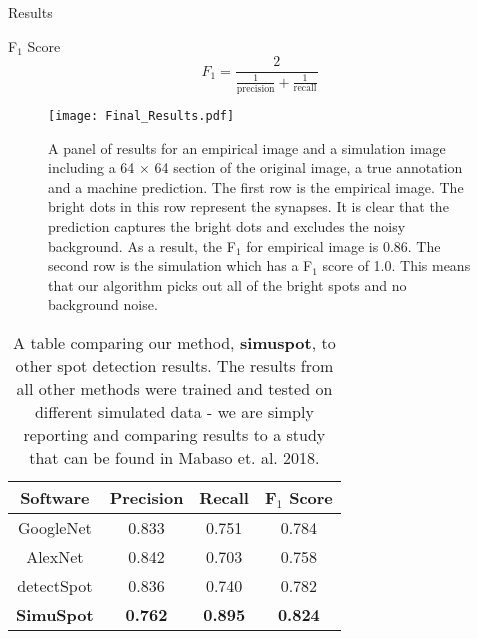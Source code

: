 \documentclass[final]{beamer}
\newlength{\onecolwid}
\begin{document}
\begin{frame}[t]
\begin{columns}[t]
\begin{column}{\onecolwid}
\begin{block}{Results}
\begin{alertblock}{F$_1$ Score}
      \begin{equation}
            F_1 =\frac{2}{\frac{1}{\text{precision}}+\frac{1}{\text{recall}}}
        \end{equation}
    \end{alertblock}
    
    \begin{figure}
        \texttt{[image: Final\_Results.pdf]}
         \setlength{\belowcaptionskip}{-30pt}
        \caption{ A panel of results for an empirical image and a simulation image including a 64 $\times$ 64 section of the original image, a true annotation and a machine prediction. The first row is the empirical image. The bright dots in this row represent the synapses. It is clear that the prediction captures the bright dots and excludes the noisy background. As a result, the F$_1$ for empirical image is 0.86. The second row is the simulation which has a F$_1$ score of 1.0. This means that our algorithm picks out all of the bright spots and no background noise.}
    \end{figure}
    \vspace{.5in}

    \begin{table}[h]
        \setlength{\tabcolsep}{40pt}
        \centering
        \begin{tabular}{|c|c|c|c|}
            \hline
            Software & Precision & Recall & F$_1$ Score \\
            \hline
            GoogleNet & 0.833 & 0.751 & 0.784 \\
            \hline
            AlexNet & 0.842 & 0.703 & 0.758 \\
            \hline
            detectSpot & 0.836 & 0.740 & 0.782 \\
            \hline
            \textbf{SimuSpot} & \textbf{0.762}  & \textbf{0.895} & \textbf{0.824} \\
            \hline
        \end{tabular}
        \caption{ A table comparing our method, \textbf{simuspot}, to other spot detection results. The results from all other methods were trained and tested on different simulated data - we are simply reporting and comparing results to a study that can be found in Mabaso et. al. 2018.}
    \end{table}


\end{block}
\end{column}
\end{columns}
\end{frame}
\end{document}
